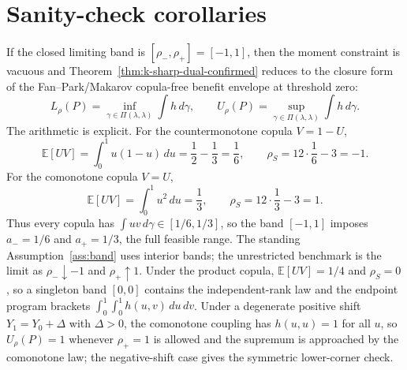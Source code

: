 \documentclass[11pt]{article}
\newcommand{\E}{\mathbb{E}}
\theoremstyle{definition}
\theoremstyle{plain}
\theoremstyle{remark}
\begin{document}
\section{Sanity-check corollaries}
If the closed limiting band is \([\rho_-,\rho_+]=[-1,1]\), then the moment constraint is vacuous and Theorem~\ref{thm:k-sharp-dual-confirmed} reduces to the closure form of the Fan--Park/Makarov copula-free benefit envelope at threshold zero:
\[
L_\rho(P)=\inf_{\gamma\in\Pi(\lambda,\lambda)}\int h\,d\gamma,\qquad
U_\rho(P)=\sup_{\gamma\in\Pi(\lambda,\lambda)}\int h\,d\gamma.
\]
The arithmetic is explicit.  For the countermonotone copula \(V=1-U\),
\[
\E[UV]=\int_0^1u(1-u)\,du=\frac12-\frac13=\frac16,\qquad
\rho_S=12\cdot\frac16-3=-1.
\]
For the comonotone copula \(V=U\),
\[
\E[UV]=\int_0^1u^2\,du=\frac13,\qquad
\rho_S=12\cdot\frac13-3=1.
\]
Thus every copula has \(\int uv\,d\gamma\in[1/6,1/3]\), so the band \([-1,1]\) imposes \(a_-=1/6\) and \(a_+=1/3\), the full feasible range.  The standing Assumption~\ref{ass:band} uses interior bands; the unrestricted benchmark is the limit as \(\rho_-\downarrow-1\) and \(\rho_+\uparrow1\).  Under the product copula, \(\E[UV]=1/4\) and \(\rho_S=0\), so a singleton band \([0,0]\) contains the independent-rank law and the endpoint program brackets \(\int_0^1\int_0^1 h(u,v)\,du\,dv\).  Under a degenerate positive shift \(Y_1=Y_0+\Delta\) with \(\Delta>0\), the comonotone coupling has \(h(u,u)=1\) for all \(u\), so \(U_\rho(P)=1\) whenever \(\rho_+=1\) is allowed and the supremum is approached by the comonotone law; the negative-shift case gives the symmetric lower-corner check.
\end{document}
